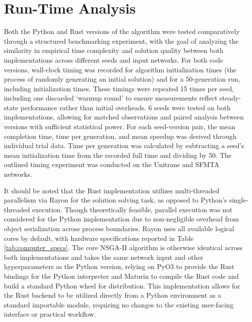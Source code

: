 \section{Run-Time Analysis}\label{sec:run_time}

Both the Python and Rust versions of the algorithm were tested comparatively through a structured benchmarking experiment, with the goal of analyzing the similarity in empirical time complexity and solution quality between both implementations across different seeds and input networks. For both code versions, wall-clock timing was recorded for algorithm initialization times (the process of randomly generating an initial solution) and for a 50-generation run, including initialization times. These timings were repeated 15 times per seed, including one discarded ‘warmup round’ to ensure measurements reflect steady-state performance rather than initial overheads. 6 seeds were tested on both implementations, allowing for matched observations and paired analysis between versions with sufficient statistical power. For each seed-version pair, the mean completion time, time per generation, and mean speedup was derived through individual trial data. Time per generation was calculated by subtracting a seed’s mean initialization time from the recorded full time and dividing by 50. The outlined timing experiment was conducted on the Unitrans and SFMTA networks. 

It should be noted that the Rust implementation utilizes multi-threaded parallelism via Rayon for the solution solving task, as opposed to Python’s single-threaded execution. Though theoretically feasible, parallel execution was not considered for the Python implementation due to non-negligible overhead from object serialization across process boundaries. Rayon uses all available logical cores by default, with hardware specifications reported in Table \ref{tab:computer_specs}. The core NSGA-II algorithm is otherwise identical across both implementations and takes the same network input and other hyperparameters as the Python version, relying on PyO3 to provide the Rust bindings for the Python interpreter and Maturin to compile the Rust code and build a standard Python wheel for distribution. This implementation allows for the Rust backend to be utilized directly from a Python environment as a standard importable module, requiring no changes to the existing user-facing interface or practical workflow.


